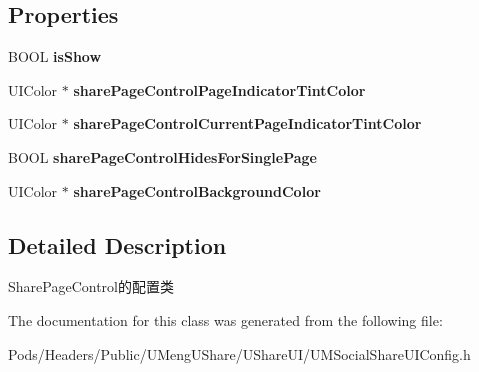 \subsection*{Properties}
\begin{DoxyCompactItemize}
\item 
\mbox{\label{interface_u_m_social_share_page_control_config_abcda17437b829585a36c20e0a155a582}} 
B\+O\+OL {\bfseries is\+Show}
\item 
\mbox{\label{interface_u_m_social_share_page_control_config_a4ea3d8d9c9c7557b5168b1673b7d7b5f}} 
U\+I\+Color $\ast$ {\bfseries share\+Page\+Control\+Page\+Indicator\+Tint\+Color}
\item 
\mbox{\label{interface_u_m_social_share_page_control_config_a35367a9e8409e9c19d376fd946ee1893}} 
U\+I\+Color $\ast$ {\bfseries share\+Page\+Control\+Current\+Page\+Indicator\+Tint\+Color}
\item 
\mbox{\label{interface_u_m_social_share_page_control_config_aa4601326b475abc9c7f50d78898abb62}} 
B\+O\+OL {\bfseries share\+Page\+Control\+Hides\+For\+Single\+Page}
\item 
\mbox{\label{interface_u_m_social_share_page_control_config_a663baf5dbcfa8c0bac91ac11b31846d3}} 
U\+I\+Color $\ast$ {\bfseries share\+Page\+Control\+Background\+Color}
\end{DoxyCompactItemize}


\subsection{Detailed Description}
Share\+Page\+Control的配置类 

The documentation for this class was generated from the following file\+:\begin{DoxyCompactItemize}
\item 
Pods/\+Headers/\+Public/\+U\+Meng\+U\+Share/\+U\+Share\+U\+I/U\+M\+Social\+Share\+U\+I\+Config.\+h\end{DoxyCompactItemize}
